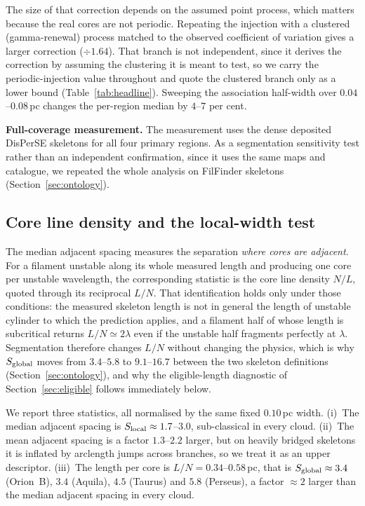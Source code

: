 \documentclass[usenatbib,twoside,twocolumn]{mnras}
\begin{document}
The size of that correction depends on the assumed point process, which matters because the real cores are not periodic. Repeating the injection with a clustered (gamma-renewal) process matched to the observed coefficient of variation gives a larger correction ($\div1.64$). That branch is not independent, since it derives the correction by assuming the clustering it is meant to test, so we carry the periodic-injection value throughout and quote the clustered branch only as a lower bound (Table~\ref{tab:headline}). Sweeping the association half-width over $0.04$--$0.08$\,pc changes the per-region median by $4$--$7$ per cent.

\smallskip\noindent\textbf{Full-coverage measurement.} The measurement uses the dense deposited DisPerSE skeletons for all four primary regions. As a segmentation sensitivity test rather than an independent confirmation, since it uses the same maps and catalogue, we repeated the whole analysis on FilFinder skeletons (Section~\ref{sec:ontology}).



\subsection{Core line density and the local-width test}
\label{sec:linedensity}

The median adjacent spacing measures the separation \emph{where cores are adjacent}. For a filament unstable along its whole measured length and producing one core per unstable wavelength, the corresponding statistic is the core line density $N/L$, quoted through its reciprocal $L/N$. That identification holds only under those conditions: the measured skeleton length is not in general the length of unstable cylinder to which the prediction applies, and a filament half of whose length is subcritical returns $L/N\simeq2\lambda$ even if the unstable half fragments perfectly at $\lambda$. Segmentation therefore changes $L/N$ without changing the physics, which is why $S_{\rm global}$ moves from $3.4$--$5.8$ to $9.1$--$16.7$ between the two skeleton definitions (Section~\ref{sec:ontology}), and why the eligible-length diagnostic of Section~\ref{sec:eligible} follows immediately below.

We report three statistics, all normalised by the same fixed $0.10$\,pc width. (i)~The median adjacent spacing is $S_{\rm local}\approx1.7$--$3.0$, sub-classical in every cloud. (ii)~The mean adjacent spacing is a factor $1.3$--$2.2$ larger, but on heavily bridged skeletons it is inflated by arclength jumps across branches, so we treat it as an upper descriptor. (iii)~The length per core is $L/N=0.34$--$0.58$\,pc, that is $S_{\rm global}\approx3.4$ (Orion~B), $3.4$ (Aquila), $4.5$ (Taurus) and $5.8$ (Perseus), a factor $\approx2$ larger than the median adjacent spacing in every cloud.
\end{document}
